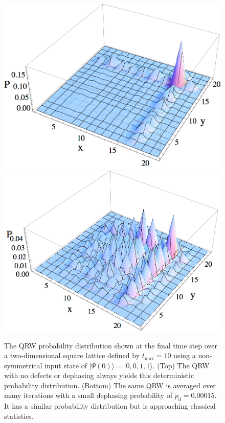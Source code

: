 \documentclass[aps,pra,twocolumn,amsmath,amssymb,nofootinbib,superscriptaddress]{revtex4}
\newcommand{\ket}[1]{|#1\rangle}
\begin{document}
\begin{figure}[]
\includegraphics[scale=0.5]{AndersonNoDephasing.pdf}\\
\includegraphics[scale=0.5]{AndersonDephasing.pdf}
\caption{\label{fig:AndersonNoDephasing} The QRW probability distribution shown at the final time step over a two-dimensional square lattice defined by $t_\mathrm{max}=10$ using a non-symmetrical input state of $\ket{\Psi(0)}=\ket{0,0,1,1}$. (Top) The QRW with no defects or dephasing always yields this deterministic probability distribution. (Bottom) The same QRW is averaged over many iterations with a small dephasing probability of $p_{\mathrm{d}}=0.00015$. It has a similar probability distribution but is approaching classical statistics.}
\end{figure}
\end{document}
